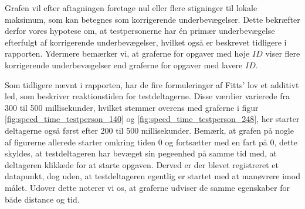 Grafen vil efter aftagningen foretage nul eller flere stigninger til lokale maksimum, som kan betegnes som korrigerende underbevægelser. Dette bekræfter derfor vores hypotese om, at testpersonerne har én primær underbevægelse efterfulgt af korrigerende underbevægelser, hvilket også er beskrevet tidligere i rapporten. Ydermere bemærker vi, at graferne for opgaver med høje $ID$ viser flere korrigerende underbevægelser end graferne for opgaver med lavere $ID$.

Som tidligere nævnt i rapporten, har de fire formuleringer af Fitts' lov et additivt led, som beskriver reaktionstiden for testdeltagerne. Disse værdier varierede fra 300 til 500 millisekunder, hvilket stemmer overens med graferne i figur \ref{fig:speed_time_testperson_140} og \ref{fig:speed_time_testperson_248}, her starter deltagerne også først efter 200 til 500 millisekunder. Bemærk, at grafen på nogle af figurerne allerede starter omkring tiden 0 og fortsætter med en fart på 0, dette skyldes, at testdeltageren har bevæget sin pegeenhed på samme tid med, at deltageren klikkede for at starte opgaven. Derved er der blevet registreret et datapunkt, dog uden, at testdeltageren egentlig er startet med at manøvrere imod målet. Udover dette noterer vi os, at graferne udviser de samme egenskaber for både distance og tid.

